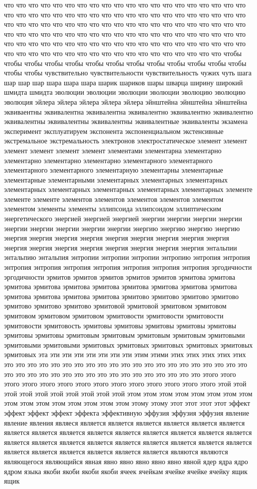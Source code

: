 что что что что что что что что что что что что что что что что что что что что что что что что что что что что что что что что что что что что что что что что что что что что что что что что что что что что что что что что что что что что что что что что что что что что что что что что что что что что что что что что что что что что что что что что что что что что что что что что что что что что что что что что что что что что что что что что что что что что что что чтобы чтобы чтобы чтобы чтобы чтобы чтобы чтобы чтобы чтобы чтобы чтобы чтобы чтобы чтобы чувствительно чувствительности чувствительность чужих чуть шага шар шар шар шара шара шара шарик шариков шары шварца ширину широкий шмидта шмидта эволюции эволюции эволюции эволюции эволюцию эволюцию эволюция эйлера эйлера эйлера эйлера эйлера эйнштейна эйнштейна эйнштейна эквиваентны эквивалентна эквивалентна эквивалентно эквивалентно эквивалентно эквивалентны эквивалентны эквивалентны эквивалентные эквиваленты экзамена эксперимент эксплуатируем экспонента экспоненциальном экстенсивные экстремальное экстремальность электронов электростатическое элемент элемент элемент элемент элемент элемент элементами элементарна элементарно элементарно элементарно элементарно элементарного элементарного элементарного элементарного элементарную элементарны элементарные элементарные элементарными элементарных элементарных элементарных элементарных элементарных элементарных элементарных элементарных элементе элементе элементе элементов элементов элементов элементов элементом элементом элементы элементы эллипсоида эллипсоидом эллиптическим энергетического энергией энергией энергией энергии энергии энергии энергии энергии энергии энергии энергии энергии энергию энергию энергию энергию энергия энергия энергия энергия энергия энергия энергия энергия энергия энергия энергия энергия энергия энергия энергия энергия энергия энтальпии энтальпию энтальпия энтропии энтропии энтропии энтропию энтропия энтропия энтропия энтропия энтропия энтропия энтропия энтропия энтропия эргодичности эргодичности эрмитов эрмитов эрмитов эрмитов эрмитов эрмитова эрмитова эрмитова эрмитова эрмитова эрмитова эрмитова эрмитова эрмитова эрмитова эрмитова эрмитова эрмитова эрмитова эрмитово эрмитово эрмитово эрмитово эрмитово эрмитово эрмитово эрмитовой эрмитовой эрмитовом эрмитовом эрмитовом эрмитовом эрмитовом эрмитовости эрмитовости эрмитовости эрмитовости эрмитовость эрмитовы эрмитовы эрмитовы эрмитовы эрмитовы эрмитовы эрмитовы эрмитовым эрмитовым эрмитовым эрмитовым эрмитовыми эрмитовыми эрмитовыми эрмитовых эрмитовых эрмитовых эрмитовых эрмитовых эрмитовых эта эти эти эти эти эти эти эти этим этими этих этих этих этих этих это это это это это это это это это это это это это это это это это это это это это это это это это это это это это это это это это это это это это это этого этого этого этого этого этого этого этого этого этого этого этого этого этого этой этой этой этой этой этой этой этой этой этой этом этом этом этом этом этом этом этом этом этом этом этом этом этом этом этом этому этому этот этот этот этот эффект эффект эффект эффект эффекта эффективную эффузия эффузия эффузия явление явление явления являеся является является является является является является является является является является является является является является является является является является является является является является является является является является является является является является являются являются являющегося являющийся явная явно явно явно явно явно явной ядер ядра ядро ядром языка якоби якоби якоби якоби ячеек ячейкам ячейке ячейке ячейку ящик ящик 
